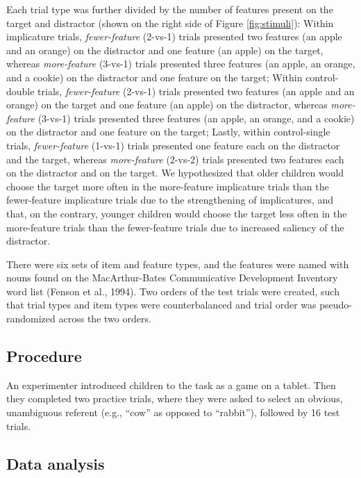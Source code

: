 \documentclass[mask,man]{apa6}
\theoremstyle{definition}
\theoremstyle{definition}
\theoremstyle{definition}
\theoremstyle{remark}
\begin{document}
Each trial type was further divided by the number of features present on
the target and distractor (shown on the right side of Figure
\ref{fig:stimuli}): Within implicature trials, \emph{fewer-feature}
(2-vs-1) trials presented two features (an apple and an orange) on the
distractor and one feature (an apple) on the target, whereas
\emph{more-feature} (3-vs-1) trials presented three features (an apple,
an orange, and a cookie) on the distractor and one feature on the
target; Within control-double trials, \emph{fewer-feature} (2-vs-1)
trials presented two features (an apple and an orange) on the target and
one feature (an apple) on the distractor, whereas \emph{more-feature}
(3-vs-1) trials presented three features (an apple, an orange, and a
cookie) on the distractor and one feature on the target; Lastly, within
control-single trials, \emph{fewer-feature} (1-vs-1) trials presented
one feature each on the distractor and the target, whereas
\emph{more-feature} (2-vs-2) trials presented two features each on the
distractor and on the target. We hypothesized that older children would
choose the target more often in the more-feature implicature trials than
the fewer-feature implicature trials due to the strengthening of
implicatures, and that, on the contrary, younger children would choose
the target less often in the more-feature trials than the fewer-feature
trials due to increased saliency of the distractor.

There were six sets of item and feature types, and the features were
named with nouns found on the MacArthur-Bates Communicative Development
Inventory word list (Fenson et al., 1994). Two orders of the test trials
were created, such that trial types and item types were counterbalanced
and trial order was pseudo-randomized across the two orders.

\subsection{Procedure}\label{procedure}

An experimenter introduced children to the task as a game on a tablet.
Then they completed two practice trials, where they were asked to select
an obvious, unambiguous referent (e.g., \enquote{cow} as opposed to
\enquote{rabbit}), followed by 16 test trials.

\subsection{Data analysis}\label{data-analysis}
\end{document}
